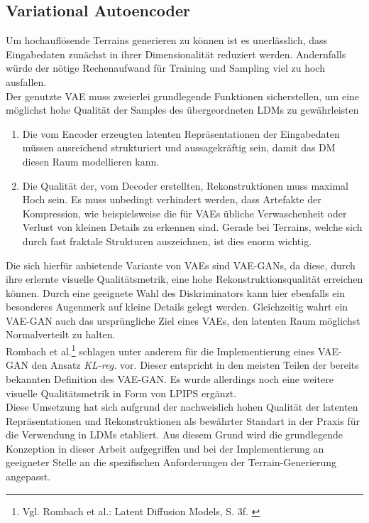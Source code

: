 \subsection {Variational Autoencoder}

Um hochauflösende Terrains generieren zu können ist es unerlässlich, dass Eingabedaten zunächst in ihrer Dimensionalität reduziert werden. Andernfalls würde der nötige Rechenaufwand für Training und Sampling viel zu hoch ausfallen. \\
Der genutzte VAE muss zweierlei grundlegende Funktionen sicherstellen, um eine möglichst hohe Qualität der Samples des übergeordneten LDMs zu gewährleisten
\begin{enumerate}
    \item Die vom Encoder erzeugten latenten Repräsentationen der Eingabedaten müssen ausreichend strukturiert und aussagekräftig sein, damit das DM diesen Raum modellieren kann.  
    \item Die Qualität der, vom Decoder erstellten, Rekonstruktionen muss maximal Hoch sein. Es muss unbedingt verhindert werden, dass Artefakte der Kompression, wie beispielsweise die für VAEs übliche Verwaschenheit oder Verlust von kleinen Details zu erkennen sind. Gerade bei Terrains, welche sich durch fast fraktale Strukturen auszeichnen, ist dies enorm wichtig.
\end{enumerate}
Die sich hierfür anbietende Variante von VAEs sind VAE-GANs, da diese, durch ihre erlernte visuelle Qualitätsmetrik, eine hohe Rekonstruktionsqualität erreichen können. Durch eine geeignete Wahl des Diskriminators kann hier ebenfalls ein besonderes Augenmerk auf kleine Details gelegt werden. Gleichzeitig wahrt ein VAE-GAN auch das ursprüngliche Ziel eines VAEs, den latenten Raum möglichst Normalverteilt zu halten. \\
Rombach et al.\footnote{
    Vgl. Rombach et al.: Latent Diffusion Models, S. 3f. 
    \cite{rombach2022high}
} schlagen unter anderem für die Implementierung eines VAE-GAN den Ansatz \textit{KL-reg.} vor. Dieser entspricht in den meisten Teilen der bereits bekannten Definition des VAE-GAN. Es wurde allerdings noch eine weitere visuelle Qualitätsmetrik in Form von LPIPS ergänzt. \\
Diese Umsetzung hat sich aufgrund der nachweislich hohen Qualität der latenten Repräsentationen und Rekonstruktionen als bewährter Standart in der Praxis für die Verwendung in LDMs etabliert. Aus diesem Grund wird die grundlegende Konzeption in dieser Arbeit aufgegriffen und bei der Implementierung an geeigneter Stelle an die spezifischen Anforderungen der Terrain-Generierung angepasst.

